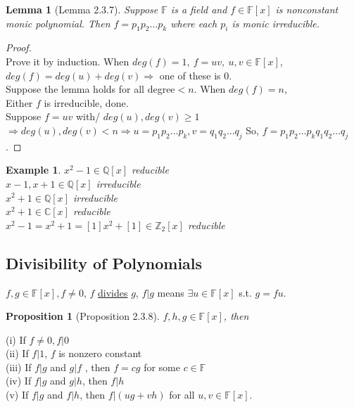 \documentclass[11pt,a4paper]{article}
\newtheorem{proposition}{Proposition}
\newtheorem{lemma}{Lemma}
\newtheorem{example}{Example}
\begin{document}
\begin{lemma}[Lemma 2.3.7]
    Suppose $\mathbb{F}$ is a field and $f\in\mathbb{F}[x]$ is nonconstant monic polynomial. Then $f = p_1p_2\dots p_k$ where each $p_i$ is monic irreducible.
\end{lemma}
\begin{proof}
\quad\\
Prove it by induction. When $deg(f)=1,\ f=uv,\ u,v\in\mathbb{F}[x]$, $deg(f)=deg(u)+deg(v)\Rightarrow$ one of these is 0.\\
Suppose the lemma holds for all degree$<n$. When $deg(f)=n$,\\
Either $f$ is irreducible, done.\\
Suppose $f = uv$ with/ $deg(u), deg(v)\geq 1$\\
$\Rightarrow deg(u),deg(v)<n\Rightarrow u=p_1p_2\dots p_k, v=q_1q_2\dots q_j$
So, $f = p_1p_2\dots p_kq_1q_2\dots q_j$.
\end{proof}
\begin{example}
$x^2-1\in\mathbb{Q}[x]$ reducible\\
$x-1,x+1\in\mathbb{Q}[x]$ irreducible\\
$x^2+1\in\mathbb{Q}[x]$ irreducible\\
$x^2+1\in\mathbb{C}[x]$ reducible\\
$x^2-1=x^2+1=[1]x^2+[1]\in\mathbb{Z}_2[x]$ reducible\\
\end{example}

\subsection{Divisibility of Polynomials}
$f,g\in\mathbb{F}[x], f\neq0$, $f$ \underline{divides} $g$, $f|g$ means $\exists u\in\mathbb{F}[x]$ s.t. $g=fu$.
\begin{proposition}[Proposition 2.3.8]
    $f , h, g \in \mathbb{F}[x]$, then
\end{proposition}
(i) If $f \neq 0, f |0$\\
(ii) If $f |1$, $f$ is nonzero constant\\
(iii) If $f |g$ and $g|f$ , then $f = cg$ for some $c \in \mathbb{F}$\\
(iv) If $f |g$ and $g|h$, then $f |h$\\
(v) If $f|g$ and $f|h$, then $f|(ug + vh)$ for all $u, v \in \mathbb{F}[x]$.\\
\end{document}
